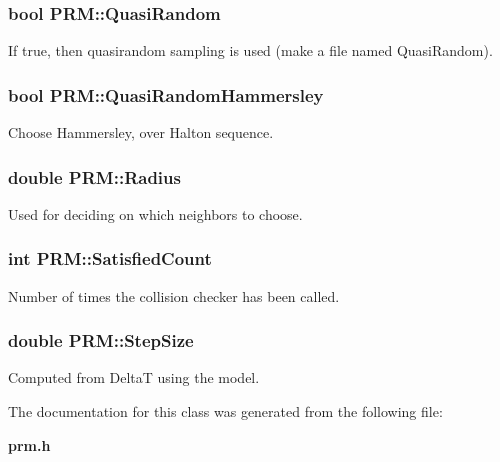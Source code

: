 \subsubsection{\setlength{\rightskip}{0pt plus 5cm}bool PRM::Quasi\-Random}\label{class_PRM_m2}


If true, then quasirandom sampling is used (make a file named Quasi\-Random).

\subsubsection{\setlength{\rightskip}{0pt plus 5cm}bool PRM::Quasi\-Random\-Hammersley}\label{class_PRM_m3}


Choose Hammersley, over Halton sequence.

\subsubsection{\setlength{\rightskip}{0pt plus 5cm}double PRM::Radius}\label{class_PRM_m0}


Used for deciding on which neighbors to choose.

\subsubsection{\setlength{\rightskip}{0pt plus 5cm}int PRM::Satisfied\-Count}\label{class_PRM_m1}


Number of times the collision checker has been called.

\subsubsection{\setlength{\rightskip}{0pt plus 5cm}double PRM::Step\-Size\hspace{0.3cm}{\tt  [protected]}}\label{class_PRM_n0}


Computed from Delta\-T using the model.



The documentation for this class was generated from the following file:\begin{CompactItemize}
\item 
{\bf prm.h}\end{CompactItemize}
